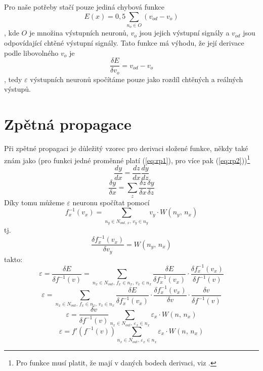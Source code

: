 \documentclass[12pt]{report}			%
\begin{document}
					Pro naše potřeby stačí pouze jediná chybová funkce
					\begin{equation} E(x) = 0,5\sum_{n_o \in O}\left(v_{od} - v_o\right) \end{equation}
					, kde $O$ je množina výstupních neuronů, $v_o$ jsou jejich výstupní signály a $v_{od}$ jsou odpovídající chtěné výstupní signály. Tato funkce má výhodu, že její derivace podle libovolného $v_o$ je 
					\begin{equation} \frac{\delta E}{\delta v_o} = v_{od} - v_o \label{eq:ef} \end{equation}
					, tedy $\varepsilon$ výstupních neuronů spočítáme pouze jako rozdíl chtěných a reálných výstupů.
				
				\section{Zpětná propagace}
					Při zpětné propagaci je důležitý vzorec pro derivaci složené funkce, někdy také znám jako  (pro funkci jedné proměnné platí (\ref{eq:rp1}), pro více pak (\ref{eq:rp2}))\footnote{Pro funkce musí platit, že mají v daných bodech derivaci, viz \autocite[s. 623]{book:Matanalysis}.}
					\begin{equation} \frac{dy}{dx} = \frac{dz}{dx}\frac{dy}{dz} \label{eq:rp1} \end{equation}
					\begin{equation} \frac{\delta y}{\delta x} = \sum_z\frac{\delta z}{\delta x}\frac{\delta y}{\delta z} \label{eq:rp2} \end{equation}
					Díky tomu můžeme $\varepsilon$ neuronu spočítat pomocí
					\begin{equation} f_x^{-1}(v_x) = \sum_{n_y \in N_{out,\,x},\,v_y \in n_y} v_y \cdot W\left(n_y,\,n_x\right) \label{eq:f1} \end{equation}
					tj.
					\begin{equation} \frac{\delta f_x^{-1}(v_x)}{\delta v_y} = W\left(n_y,\,n_x\right) \end{equation}
					takto:
					\begin{equation} \varepsilon = \frac{ \delta E}{\delta f^{-1}(v)} = \sum_{n_x \in N_{out},\,f_x \in n_x,\,v_x \in n_x}\frac{ \delta E}{\delta f_x^{-1}(v_x)}\cdot\frac{ \delta f_x^{-1}(v_x)}{\delta f^{-1}(v)} \end{equation}
					\begin{equation} \varepsilon = \sum_{n_x \in N_{out},\,f_x \in n_x,\,v_x \in n_x}\frac{ \delta E}{\delta f_x^{-1}(v_x)}\cdot\frac{ \delta f_x^{-1}(v_x)}{\delta v}\cdot\frac{\delta v}{\delta f^{-1}(v)} \end{equation}
					\begin{equation} \varepsilon = \frac{ \delta v}{\delta f^{-1}(v)}\sum_{n_x \in N_{out},\,\varepsilon_x \in n_x}\varepsilon_x \cdot W\left(n,\,n_x\right) \end{equation}
					\begin{equation} \varepsilon = f'\left(f^{-1}(v)\right) \sum_{n_x \in N_{out},\,\varepsilon_x \in n_x} \varepsilon_x \cdot W\left(n,\,n_x\right) \label{eq:bpve} \end{equation}
					
\end{document}
